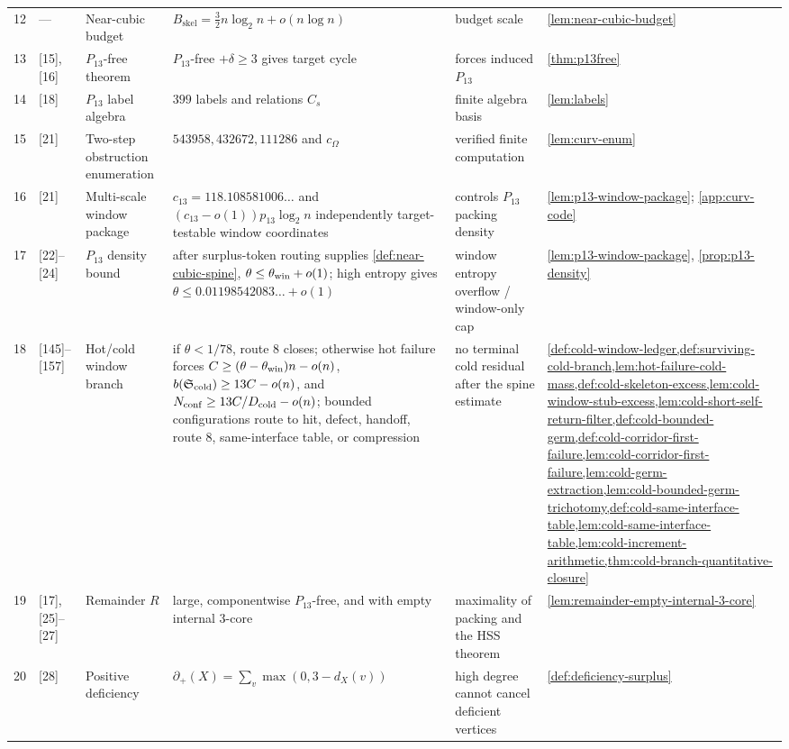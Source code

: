 \documentclass[11pt]{article}
\newcommand{\defp}{\partial_+}
\begin{document}
{\begin{longtable}{C{0.04\textwidth} L{0.13\textwidth} L{0.17\textwidth} L{0.25\textwidth} L{0.21\textwidth} L{0.12\textwidth}}
12 & --- & Near-cubic budget & $B_{\mathrm{skel}}=\frac32 n\log_2n+o(n\log n)$ & budget scale & \cref{lem:near-cubic-budget} \\
13 & [15], [16] & $P_{13}$-free theorem & $P_{13}$-free $+\delta\ge3$ gives target cycle & forces induced $P_{13}$ & \cref{thm:p13free} \\
14 & [18] & $P_{13}$ label algebra & $399$ labels and relations $C_s$ & finite algebra basis & \cref{lem:labels} \\
15 & [21] & Two-step obstruction enumeration & $543958,432672,111286$ and $c_\Omega$ & verified finite computation & \cref{lem:curv-enum} \\
16 & [21] & Multi-scale window package & $c_{13}=118.108581006\ldots$ and \((c_{13}-o(1))p_{13}\log_2 n\) independently target-testable window coordinates & controls $P_{13}$ packing density & \cref{lem:p13-window-package}; \cref{app:curv-code} \\
17 & [22]--[24] & $P_{13}$ density bound & after surplus-token routing supplies \cref{def:near-cubic-spine}, $\theta\le\theta_{\rm win}+o(1)$; high entropy gives $\theta\le0.01198542083\ldots+o(1)$ & window entropy overflow / window-only cap & \cref{lem:p13-window-package}, \cref{prop:p13-density} \\
18 & [145]--[157] & Hot/cold window branch & if \(\theta<1/78\), route 8 closes; otherwise hot failure forces \(C\ge(\theta-\theta_{\rm win})n-o(n)\), \(b(\mathfrak S_{\rm cold})\ge13C-o(n)\), and \(N_{\rm conf}\ge13C/D_{\rm cold}-o(n)\); bounded configurations route to hit, defect, handoff, route 8, same-interface table, or compression & no terminal cold residual after the spine estimate & \cref{def:cold-window-ledger,def:surviving-cold-branch,lem:hot-failure-cold-mass,def:cold-skeleton-excess,lem:cold-window-stub-excess,lem:cold-short-self-return-filter,def:cold-bounded-germ,def:cold-corridor-first-failure,lem:cold-corridor-first-failure,lem:cold-germ-extraction,lem:cold-bounded-germ-trichotomy,def:cold-same-interface-table,lem:cold-same-interface-table,lem:cold-increment-arithmetic,thm:cold-branch-quantitative-closure} \\
19 & [17], [25]--[27] & Remainder $R$ & large, componentwise $P_{13}$-free, and with empty internal $3$-core & maximality of packing and the HSS theorem & \cref{lem:remainder-empty-internal-3-core} \\
20 & [28] & Positive deficiency & $\defp(X)=\sum_v\max(0,3-d_X(v))$ & high degree cannot cancel deficient vertices & \cref{def:deficiency-surplus} \\

\end{longtable}}
\end{document}
